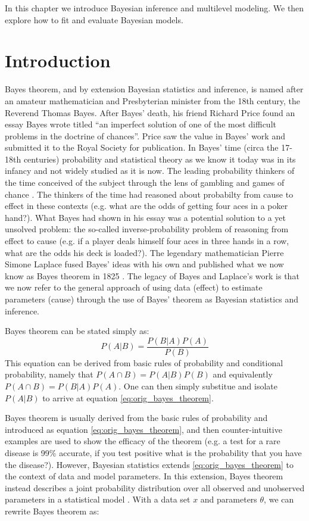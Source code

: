 In this chapter we introduce Bayesian inference and multilevel modeling. We then explore how to fit and evaluate Bayesian models.

\section{Introduction}

Bayes theorem, and by extension Bayesian statistics and inference, is named after an amateur mathematician and Presbyterian minister from the 18th century, the Reverend Thomas Bayes. After Bayes' death, his friend Richard Price found an essay Bayes wrote titled ``an imperfect solution of one of the most difficult problems in the doctrine of chances''. Price saw the value in Bayes' work and submitted it to the Royal Society for publication. In Bayes' time (circa the 17-18th centuries) probability and statistical theory as we know it today was in its infancy and not widely studied as it is now. The leading probability thinkers of the time conceived of the subject through the lens of gambling and games of chance \cite{David1998} \cite{Moivre1718}. The thinkers of the time had reasoned about probabilty from cause to effect in these contexts (e.g. what are the odds of getting four aces in a poker hand?). What Bayes had shown in his essay was a potential solution to a yet unsolved problem: the so-called inverse-probability problem of reasoning from effect to cause (e.g. if a player deals himself four aces in three hands in a row, what are the odds his deck is loaded?). The legendary mathematician Pierre Simone Laplace fused Bayes' ideas with his own and published what we now know as Bayes theorem in 1825 \cite{Stigler1986}. The legacy of Bayes and Laplace's work is that we now refer to the general approach of using data (effect) to estimate parameters (cause) through the use of Bayes' theorem as Bayesian statistics and inference.

Bayes theorem can be stated simply as:
\begin{equation} \label{eq:orig_bayes_theorem}
P(A|B) = \frac{P(B|A)P(A)}{P(B)}
\end{equation}
This equation can be derived from basic rules of probability and conditional probability, namely that $P(A \cap B) = P(A|B)P(B)$ and equivalently $P(A \cap B) = P(B|A)P(A)$. One can then simply substitue and isolate $P(A|B)$ to arrive at equation \ref{eq:orig_bayes_theorem}.

Bayes theorem is usually derived from the basic rules of probability and introduced as equation \ref{eq:orig_bayes_theorem}, and then counter-intuitive examples are used to show the efficacy of the theorem (e.g. a test for a rare disease is 99\% accurate, if you test positive what is the probability that you have the disease?). However, Bayesian statistics extends \ref{eq:orig_bayes_theorem} to the context of data and model parameters. In this extension, Bayes theorem instead describes a joint probability distribution over all observed and unobserved parameters in a statistical model \cite{Schoot2021}. With a data set $x$ and parameters $\theta$, we can rewrite Bayes theorem as:

